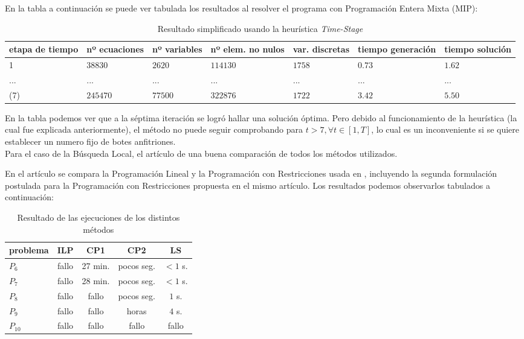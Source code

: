\documentclass[letter, 10pt]{article}
\begin{document}
En la tabla a continuación se puede ver tabulada los resultados al resolver el programa con Programación Entera Mixta (MIP):\\

\begin{table}[h!]
  \begin{center}
	\begin{tabular}{|p{1.1cm}|l|l|p{1.5cm}|p{1.2cm}|p{1cm}|p{1
	cm}|}
	\hline
	etapa de tiempo & nº ecuaciones & nº variables & nº elem. no nulos & var. discretas & tiempo generación & tiempo solución \\ \hline
	1 & $38830$ & $2620$ & $114130$ & $1758$ & $0.73$ & $1.62$ \\ \hline
	... & ... & ... & ... & ... & ... & ... \\ \hline
	(7) & $245470$ & $77500$ & $322876$ & $1722$ & $3.42$ & $5.50$ \\ \hline
	\end{tabular}
  \end{center}
  \caption{Resultado simplificado usando la heurística \textit{Time-Stage}}
\end{table}

En la tabla podemos ver que a la séptima iteración se logró hallar una solución óptima. Pero debido al funcionamiento de la heurística (la cual fue explicada anteriormente), el método no puede seguir comprobando para $t > 7, \forall t \in [1,T]$, lo cual es un inconveniente si se quiere establecer un numero fijo de botes anfitriones. \\

Para el caso de la Búsqueda Local, el artículo \cite{LocalSearch} de una buena comparación de todos los métodos utilizados.

En el artículo se compara la Programación Lineal y la Programación con Restricciones usada en \cite{FirstPublication}, incluyendo la segunda formulación postulada para la Programación con Restricciones propuesta en el mismo artículo. Los resultados podemos observarlos tabulados a continuación:\\

\begin{table}[h!]
  \begin{center}
	\begin{tabular}{|l||c|c|c|c|}
	\hline
	problema & ILP & CP1 & CP2 & LS \\ \hline
	$P_6$ & fallo & 27 min. & pocos seg. & $< 1$ s. \\ \hline
	$P_7$ & fallo & 28 min. & pocos seg. & $< 1$ s. \\ \hline
	$P_8$ & fallo & fallo & pocos seg. & $1$ s. \\ \hline
	$P_9$ & fallo & fallo & horas & $4$ s. \\ \hline
	$P_10$ & fallo & fallo & fallo & fallo \\ \hline
	\end{tabular}
  \end{center}
  \caption{Resultado de las ejecuciones de los distintos métodos}
\end{table}
\end{document}
